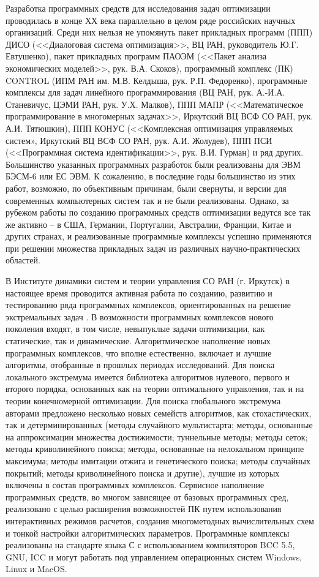 Разработка программных средств для исследования задач оптимизации проводилась в конце ХХ века параллельно в целом ряде российских научных организаций. Среди них нельзя не упомянуть пакет прикладных программ (ППП) ДИСО (<<Диалоговая система оптимизация>>, ВЦ РАН, руководитель Ю.Г. Евтушенко), пакет прикладных программ ПАОЭМ (<<Пакет анализа экономических моделей>>, рук. В.А. Скоков), программный комплекс (ПК) CONTROL (ИПМ РАН им. М.В. Келдыша, рук. Р.П. Федоренко), программные комплексы для задач линейного программирования (ВЦ РАН, рук. А.-И.А. Станевичус, ЦЭМИ РАН, рук. У.Х. Малков), ППП МАПР (<<Математическое программирование в многомерных задачах>>, Иркутский ВЦ ВСФ СО РАН, рук. А.И. Тятюшкин), ППП КОНУС (<<Комплексная оптимизация управляемых систем», Иркутский ВЦ ВСФ СО РАН, рук. А.И. Жолудев), ППП ПСИ (<<Программная система идентификации>>, рук. В.И. Гурман) и ряд других. Большинство указанных программных разработок были реализованы для ЭВМ БЭСМ-6 или ЕС ЭВМ. К сожалению, в последние годы большинство из этих работ, возможно, по объективным причинам, были свернуты, и версии для современных компьютерных систем так и не были реализованы. Однако, за рубежом работы по созданию программных средств оптимизации ведутся все так же активно – в США, Германии, Португалии, Австралии, Франции, Китае и других странах, и реализованные программные комплексы успешно применяются при решении множества прикладных задач из различных научно-практических областей.


В Институте динамики систем и теории управления СО РАН (г. Иркутск) в настоящее время проводится активная работа по созданию, развитию и тестированию ряда программных комплексов, ориентированных на решение экстремальных задач \cite{Gor09}. В возможности программных комплексов нового поколения входят, в том числе, невыпуклые задачи оптимизации, как статические, так и динамические. Алгоритмическое наполнение новых программных комплексов, что вполне естественно, включает и лучшие алгоритмы, отобранные в прошлых периодах исследований. Для поиска локального экстремума имеется библиотека алгоритмов нулевого, первого и второго порядка, основанных как на теории оптимального управления, так и на теории конечномерной оптимизации. Для поиска глобального экстремума авторами предложено несколько новых семейств алгоритмов, как стохастических, так и детерминированных (методы случайного мультистарта; методы, основанные на аппроксимации множества достижимости; туннельные методы; методы сеток; методы криволинейного поиска; методы, основанные на нелокальном принципе максимума; методы имитации отжига и генетического поиска; методы случайных покрытий; методы криволинейного поиска и другие), лучшие из которых включены в состав программных комплексов. Сервисное наполнение программных средств, во многом зависящее от базовых программных сред, реализовано с целью расширения возможностей ПК путем использования интерактивных режимов расчетов, создания многометодных вычислительных схем и тонкой настройки алгоритмических параметров. Программные комплексы реализованы на стандарте языка С с использованием компиляторов BCC 5.5, GNU, ICC и могут работать под управлением операционных систем Windows, Linux и MacOS.

